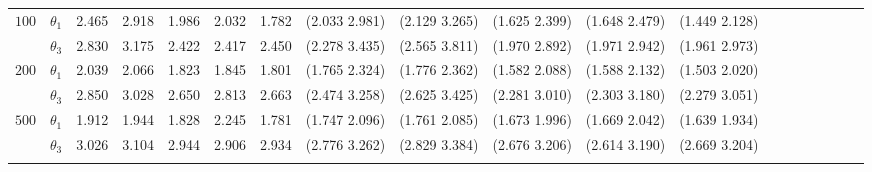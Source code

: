 \documentclass[12pt]{article}    %
\numberwithin{equation}{section}
\begin{document}
\begin{landscape}
\begin{table}
\begin{tabular}{lcccccccccccccccccr}
						\multirow{2}{*}{$100$} & $\theta_1$ & 2.465 & 2.918 & 1.986  & 2.032 &  1.782 &  (2.033 2.981) & (2.129 3.265) & (1.625 2.399) & (1.648 2.479) & (1.449 2.128) \\
						& $\theta_3$ & 2.830 & 3.175 & 2.422 &  2.417 &  2.450 &  (2.278 3.435) & (2.565 3.811) & (1.970 2.892) & (1.971 2.942) & (1.961 2.973)\\
						
						\bottomrule[\heavyrulewidth]    
						
						\multirow{2}{*}{$200$} & $\theta_1$ & 2.039 & 2.066 & 1.823 &  1.845 &  1.801 &  (1.765 2.324) & (1.776 2.362) & (1.582 2.088) & (1.588 2.132) & (1.503 2.020) \\
						& $\theta_3$ & 2.850 & 3.028 & 2.650 &  2.813 &  2.663 &  (2.474 3.258) & (2.625 3.425) & (2.281 3.010) & (2.303 3.180) & (2.279 3.051)\\
						
						\bottomrule[\heavyrulewidth]
						
						\multirow{2}{*}{$500$} & $\theta_1$ & 1.912 & 1.944 & 1.828 &  2.245 &  1.781 &  (1.747 2.096) & (1.761 2.085) & (1.673 1.996) & (1.669 2.042) & (1.639 1.934) \\
						& $\theta_3$ & 3.026 & 3.104 & 2.944 &  2.906  & 2.934 &  (2.776 3.262) & (2.829 3.384) & (2.676 3.206) & (2.614 3.190) & (2.669 3.204)\\
						\bottomrule[\heavyrulewidth]    
						\bigskip
						
					\end{tabular}
				\end{table}
			\end{landscape}
			
\end{document}
